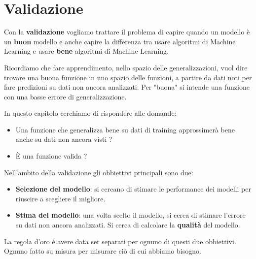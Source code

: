 \chapter{Validazione}
Con la \textbf{validazione} vogliamo trattare il problema di capire quando un modello \`e un \textbf{buon} modello e
anche capire la differenza tra usare algoritmi di Machine Learning e usare \textbf{bene} algoritmi di Machine Learning.

Ricordiamo che fare apprendimento, nello spazio delle generalizzazioni, vuol dire trovare una buona funzione in uno
spazio delle funzioni, a partire da dati noti per fare predizioni su dati non ancora analizzati. Per "buona" si intende
una funzione con una basse errore di generalizzazione.

In questo capitolo cerchiamo di rispondere alle domande:
\begin{itemize}
	\item Una funzione che generalizza bene su dati di training approssimer\`a bene anche su dati non ancora visti ?
	\item \`E una funzione valida ?
\end{itemize}

Nell'ambito della validazione gli obbiettivi principali sono due:
\begin{itemize}
	\item \textbf{Selezione del modello}: si cercano di stimare le performance dei modelli per riuscire a scegliere il
	      migliore.
	\item \textbf{Stima del modello}: una volta scelto il modello, si cerca di stimare l'errore su dati non ancora
	      analizzati. Si cerca di calcolare la \textbf{qualit\`a} del modello.
\end{itemize}
La regola d'oro \`e avere data set separati per ognuno di questi due obbiettivi. Ognuno fatto su misura per misurare
ci\`o di cui abbiamo bisogno.


